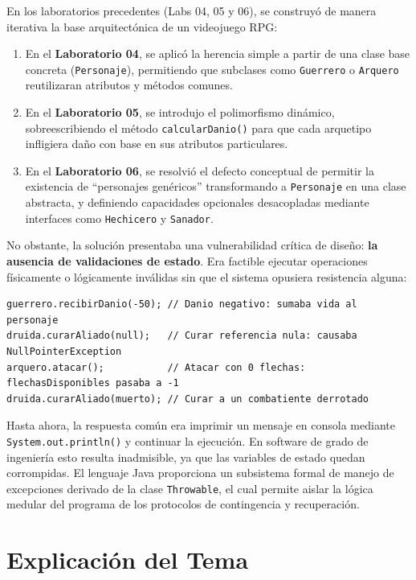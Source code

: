 \documentclass[11pt,letterpaper]{article}
\begin{document}
En los laboratorios precedentes (Labs 04, 05 y 06), se construyó de manera iterativa la base arquitectónica de un videojuego RPG:
\begin{enumerate}
    \item En el \textbf{Laboratorio 04}, se aplicó la herencia simple a partir de una clase base concreta (\texttt{Personaje}), permitiendo que subclases como \texttt{Guerrero} o \texttt{Arquero} reutilizaran atributos y métodos comunes.
    \item En el \textbf{Laboratorio 05}, se introdujo el polimorfismo dinámico, sobreescribiendo el método \texttt{calcularDanio()} para que cada arquetipo infligiera daño con base en sus atributos particulares.
    \item En el \textbf{Laboratorio 06}, se resolvió el defecto conceptual de permitir la existencia de ``personajes genéricos'' transformando a \texttt{Personaje} en una clase abstracta, y definiendo capacidades opcionales desacopladas mediante interfaces como \texttt{Hechicero} y \texttt{Sanador}.
\end{enumerate}

No obstante, la solución presentaba una vulnerabilidad crítica de diseño: \textbf{la ausencia de validaciones de estado}. Era factible ejecutar operaciones físicamente o lógicamente inválidas sin que el sistema opusiera resistencia alguna:
\begin{lstlisting}[style=JavaStyle,numbers=none]
guerrero.recibirDanio(-50); // Danio negativo: sumaba vida al personaje
druida.curarAliado(null);   // Curar referencia nula: causaba NullPointerException
arquero.atacar();           // Atacar con 0 flechas: flechasDisponibles pasaba a -1
druida.curarAliado(muerto); // Curar a un combatiente derrotado
\end{lstlisting}

Hasta ahora, la respuesta común era imprimir un mensaje en consola mediante \texttt{System.out.println()} y continuar la ejecución. En software de grado de ingeniería esto resulta inadmisible, ya que las variables de estado quedan corrompidas. El lenguaje Java proporciona un subsistema formal de manejo de excepciones derivado de la clase \texttt{Throwable}, el cual permite aislar la lógica medular del programa de los protocolos de contingencia y recuperación.

\section{Explicación del Tema}
\end{document}
